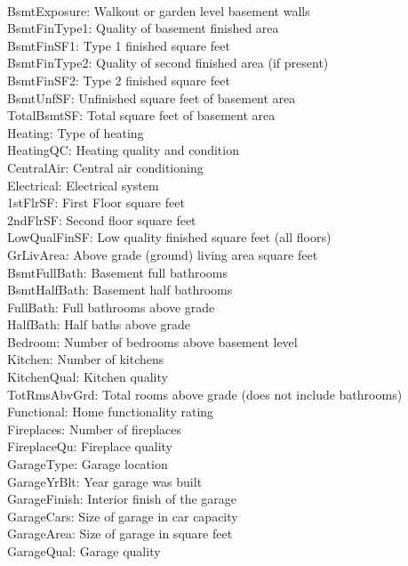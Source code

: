 \documentclass[onecolumn]{article}
\begin{document}
\begin{multicols}{3}
{\\BsmtExposure: Walkout or garden level basement walls
\\BsmtFinType1: Quality of basement finished area
\\BsmtFinSF1: Type 1 finished square feet
\\BsmtFinType2: Quality of second finished area (if present)
\\BsmtFinSF2: Type 2 finished square feet
\\BsmtUnfSF: Unfinished square feet of basement area
\\TotalBsmtSF: Total square feet of basement area
\\Heating: Type of heating
\\HeatingQC: Heating quality and condition
\\CentralAir: Central air conditioning
\\Electrical: Electrical system
\\1stFlrSF: First Floor square feet
\\2ndFlrSF: Second floor square feet
\\LowQualFinSF: Low quality finished square feet (all floors)
\\GrLivArea: Above grade (ground) living area square feet
\\BsmtFullBath: Basement full bathrooms
\\BsmtHalfBath: Basement half bathrooms
\\FullBath: Full bathrooms above grade
\\HalfBath: Half baths above grade
\\Bedroom: Number of bedrooms above basement level
\\Kitchen: Number of kitchens
\\KitchenQual: Kitchen quality
\\TotRmsAbvGrd: Total rooms above grade (does not include bathrooms)
\\Functional: Home functionality rating
\\Fireplaces: Number of fireplaces
\\FireplaceQu: Fireplace quality
\\GarageType: Garage location
\\GarageYrBlt: Year garage was built
\\GarageFinish: Interior finish of the garage
\\GarageCars: Size of garage in car capacity
\\GarageArea: Size of garage in square feet
\\GarageQual: Garage quality
}
\end{multicols}
\end{document}
